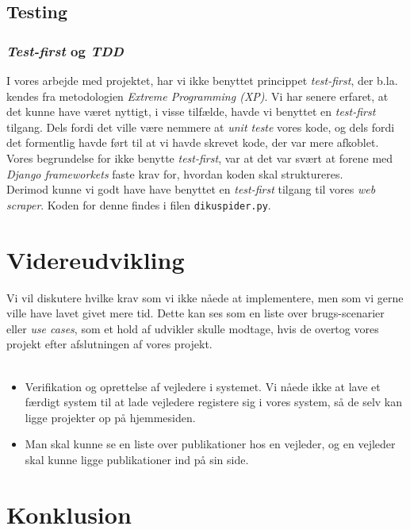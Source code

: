 \documentclass[12pt]{article}
\begin{document}
\subsection{Testing}
\subsubsection{\textit{Test-first} og \textit{TDD}}
I vores arbejde med projektet, har vi ikke benyttet princippet \textit{test-first}, der b.la. kendes fra metodologien \textit{Extreme Programming (XP)}.
Vi har senere erfaret, at det kunne have været nyttigt, i visse tilfælde, havde vi benyttet en \textit{test-first} tilgang. Dels fordi det ville være nemmere at \textit{unit teste} vores kode, og dels fordi det formentlig havde ført til at vi havde skrevet kode, der var mere afkoblet. \\
Vores begrundelse for ikke benytte \textit{test-first}, var at det var svært at forene med \textit{Django frameworkets} faste krav for, hvordan koden skal struktureres. \\
Derimod kunne vi godt have have benyttet en \textit{test-first} tilgang til vores \textit{web scraper}. Koden for denne findes i filen \texttt{dikuspider.py}.   

\section{Videreudvikling}
\label{sec:udvikling}
Vi vil diskutere hvilke krav som vi ikke nåede at implementere, men som vi gerne ville have lavet givet mere tid. Dette kan ses som en liste over brugs-scenarier eller \textit{use cases}, som et hold af udvikler skulle modtage, hvis de overtog vores projekt efter afslutningen af vores projekt. \\ \\
\begin{itemize}
\item Verifikation og oprettelse af vejledere i systemet. Vi nåede ikke at lave et færdigt system til at lade vejledere registere sig i vores system, så de selv kan ligge projekter op på hjemmesiden.
\item Man skal kunne se en liste over publikationer hos en vejleder, og en vejleder skal kunne ligge publikationer ind på sin side.
\end{itemize}

\section{Konklusion}
\label{sec:konklusion}
\end{document}
